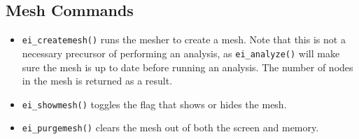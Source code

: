 \subsection{Mesh Commands}

\begin{itemize}
\item \texttt{ei\_createmesh()} runs the mesher to create a mesh. Note that this is not
a necessary precursor of performing an analysis, as
\texttt{ei\_analyze()} will make sure the mesh is up to date before
running an analysis. The number of nodes in the mesh is returned as a
result.

\item \texttt{ei\_showmesh()} toggles the flag that shows or hides the mesh.

\item \texttt{ei\_purgemesh()} clears the mesh out of both the screen and memory.
\end{itemize}

